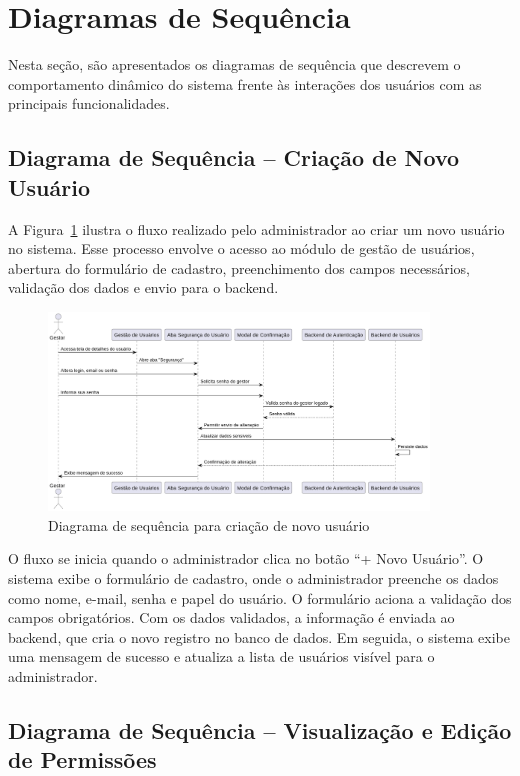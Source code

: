 \section{Diagramas de Sequência}

Nesta seção, são apresentados os diagramas de sequência que descrevem o comportamento dinâmico do sistema frente às interações dos usuários com as principais funcionalidades.

\subsection{Diagrama de Sequência – Criação de Novo Usuário}

A Figura~\ref{fig:diagrama-criacao-usuario} ilustra o fluxo realizado pelo administrador ao criar um novo usuário no sistema. Esse processo envolve o acesso ao módulo de gestão de usuários, abertura do formulário de cadastro, preenchimento dos campos necessários, validação dos dados e envio para o backend.

\begin{figure}[H]
    \centering
    \includegraphics[width=0.9\textwidth]{images/diagramasdesequencias/usercreate.png}
    \caption{Diagrama de sequência para criação de novo usuário}
    \label{fig:diagrama-criacao-usuario}
\end{figure}

O fluxo se inicia quando o administrador clica no botão “+ Novo Usuário”. O sistema exibe o formulário de cadastro, onde o administrador preenche os dados como nome, e-mail, senha e papel do usuário. O formulário aciona a validação dos campos obrigatórios. Com os dados validados, a informação é enviada ao backend, que cria o novo registro no banco de dados. Em seguida, o sistema exibe uma mensagem de sucesso e atualiza a lista de usuários visível para o administrador.

\subsection{Diagrama de Sequência – Visualização e Edição de Permissões}

